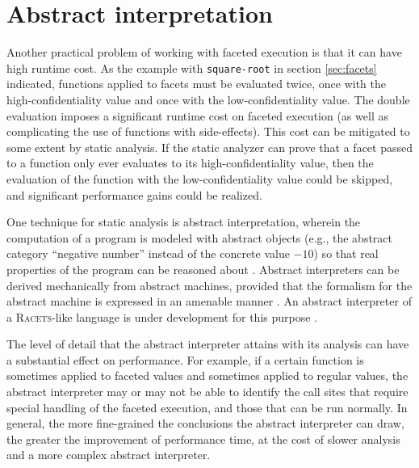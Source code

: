 \documentclass{article}
\begin{document}
\section{Abstract interpretation}
Another practical problem of working with faceted execution is that it can have high runtime cost. As the example with \texttt{square-root} in section \ref{sec:facets} indicated, functions applied to facets must be evaluated twice, once with the high-confidentiality value and once with the low-confidentiality value. The double evaluation imposes a significant runtime cost on faceted execution (as well as complicating the use of functions with side-effects). This cost can be mitigated to some extent by static analysis. If the static analyzer can prove that a facet passed to a function only ever evaluates to its high-confidentiality value, then the evaluation of the function with the low-confidentiality value could be skipped, and significant performance gains could be realized.

One technique for static analysis is abstract interpretation, wherein the computation of a program is modeled with abstract objects (e.g., the abstract category ``negative number'' instead of the concrete value $-10$) so that real properties of the program can be reasoned about \cite{ai-original}. Abstract interpreters can be derived mechanically from abstract machines, provided that the formalism for the abstract machine is expressed in an amenable manner \cite{aam}. An abstract interpreter of a \textsc{Racets}-like language is under development for this purpose \cite{abstract-inter}.

The level of detail that the abstract interpreter attains with its analysis can have a substantial effect on performance. For example, if a certain function is sometimes applied to faceted values and sometimes applied to regular values, the abstract interpreter may or may not be able to identify the call sites that require special handling of the faceted execution, and those that can be run normally. In general, the more fine-grained the conclusions the abstract interpreter can draw, the greater the improvement of performance time, at the cost of slower analysis and a more complex abstract interpreter.
\end{document}
